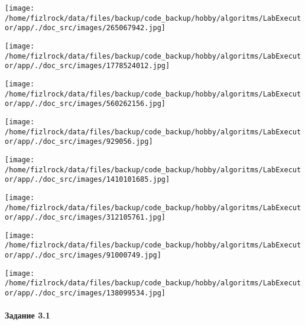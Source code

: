 \documentclass[a4paper, 12pt]{article}
\begin{document}
\texttt{[image: /home/fizlrock/data/files/backup/code\_backup/hobby/algoritms/LabExecutor/app/./doc\_src/images/265067942.jpg]}

\texttt{[image: /home/fizlrock/data/files/backup/code\_backup/hobby/algoritms/LabExecutor/app/./doc\_src/images/1778524012.jpg]}

\texttt{[image: /home/fizlrock/data/files/backup/code\_backup/hobby/algoritms/LabExecutor/app/./doc\_src/images/560262156.jpg]}

\texttt{[image: /home/fizlrock/data/files/backup/code\_backup/hobby/algoritms/LabExecutor/app/./doc\_src/images/929056.jpg]}

\texttt{[image: /home/fizlrock/data/files/backup/code\_backup/hobby/algoritms/LabExecutor/app/./doc\_src/images/1410101685.jpg]}

\texttt{[image: /home/fizlrock/data/files/backup/code\_backup/hobby/algoritms/LabExecutor/app/./doc\_src/images/312105761.jpg]}

\texttt{[image: /home/fizlrock/data/files/backup/code\_backup/hobby/algoritms/LabExecutor/app/./doc\_src/images/91000749.jpg]}

\texttt{[image: /home/fizlrock/data/files/backup/code\_backup/hobby/algoritms/LabExecutor/app/./doc\_src/images/138099534.jpg]}
\pagebreak
\paragraph{Задание 3.1}
\end{document}
